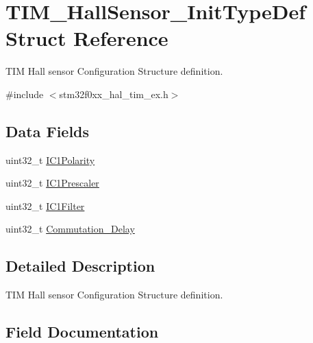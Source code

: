\hypertarget{struct_t_i_m___hall_sensor___init_type_def}{}\section{T\+I\+M\+\_\+\+Hall\+Sensor\+\_\+\+Init\+Type\+Def Struct Reference}
\label{struct_t_i_m___hall_sensor___init_type_def}


T\+IM Hall sensor Configuration Structure definition.  




{\ttfamily \#include $<$stm32f0xx\+\_\+hal\+\_\+tim\+\_\+ex.\+h$>$}

\subsection*{Data Fields}
\begin{DoxyCompactItemize}
\item 
uint32\+\_\+t \hyperlink{struct_t_i_m___hall_sensor___init_type_def_ac1191c7421a3ca4c53ec7875870812e5}{I\+C1\+Polarity}
\item 
uint32\+\_\+t \hyperlink{struct_t_i_m___hall_sensor___init_type_def_aa913a8df0a4c97fefa87ff760fae10cb}{I\+C1\+Prescaler}
\item 
uint32\+\_\+t \hyperlink{struct_t_i_m___hall_sensor___init_type_def_a5efa2ad5085fe72fb0b5dc2e2fc61def}{I\+C1\+Filter}
\item 
uint32\+\_\+t \hyperlink{struct_t_i_m___hall_sensor___init_type_def_a5d74bf14283eb95439d6d37952274f07}{Commutation\+\_\+\+Delay}
\end{DoxyCompactItemize}


\subsection{Detailed Description}
T\+IM Hall sensor Configuration Structure definition. 

\subsection{Field Documentation}
\mbox{\label{struct_t_i_m___hall_sensor___init_type_def_a5d74bf14283eb95439d6d37952274f07}} 
